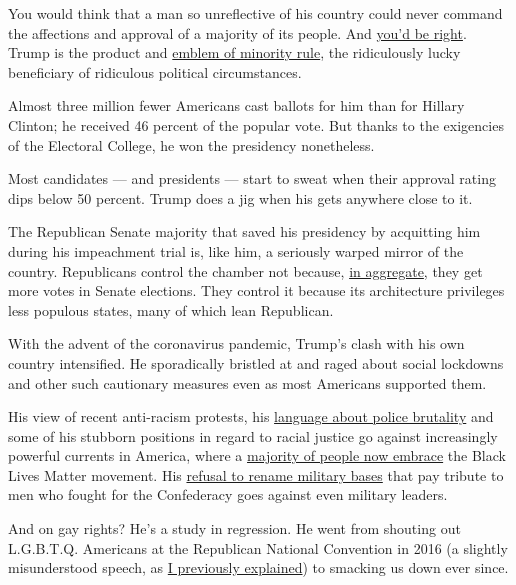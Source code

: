 You would think that a man so unreflective of his country could never
command the affections and approval of a majority of its people. And
\href{https://news.gallup.com/poll/203207/trump-job-approval-weekly.aspx}{you'd
be right}. Trump is the product and
\href{https://www.washingtonpost.com/opinions/what-unites-trumps-apologists-minority-rule/2019/11/24/152c5d06-0d6c-11ea-97ac-a7ccc8dd1ebc_story.html}{emblem
of minority rule}, the ridiculously lucky beneficiary of ridiculous
political circumstances.

Almost three million fewer Americans cast ballots for him than for
Hillary Clinton; he received 46 percent of the popular vote. But thanks
to the exigencies of the Electoral College, he won the presidency
nonetheless.

Most candidates --- and presidents --- start to sweat when their
approval rating dips below 50 percent. Trump does a jig when his gets
anywhere close to it.

The Republican Senate majority that saved his presidency by acquitting
him during his impeachment trial is, like him, a seriously warped mirror
of the country. Republicans control the chamber not because,
\href{https://www.theguardian.com/us-news/2018/nov/08/democrats-republicans-senate-majority-minority-rule}{in
aggregate}, they get more votes in Senate elections. They control it
because its architecture privileges less populous states, many of which
lean Republican.

With the advent of the coronavirus pandemic, Trump's clash with his own
country intensified. He sporadically bristled at and raged about social
lockdowns and other such cautionary measures even as most Americans
supported them.

His view of recent anti-racism protests, his
\href{https://www.vanityfair.com/news/2020/06/trump-cant-even-pretend-to-want-to-fix-police-brutality}{language
about police brutality} and some of his stubborn positions in regard to
racial justice go against increasingly powerful currents in America,
where a
\href{https://www.nytimes3xbfgragh.onion/interactive/2020/06/10/upshot/black-lives-matter-attitudes.html}{majority
of people now embrace} the Black Lives Matter movement. His
\href{https://www.politico.com/news/2020/06/10/trump-says-he-wont-consider-renaming-army-bases-breaking-with-pentagon-311271}{refusal
to rename military bases} that pay tribute to men who fought for the
Confederacy goes against even military leaders.

And on gay rights? He's a study in regression. He went from shouting out
L.G.B.T.Q. Americans at the Republican National Convention in 2016 (a
slightly misunderstood speech, as
\href{https://www.nytimes3xbfgragh.onion/2018/10/24/opinion/donald-trumps-gay-amnesia.html}{I
previously explained}) to smacking us down ever since.

